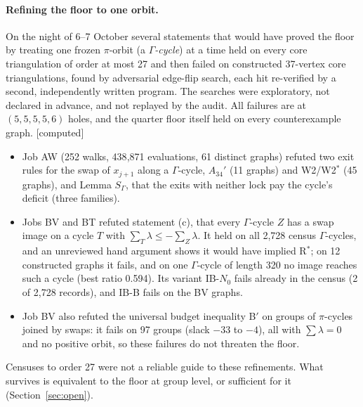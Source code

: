 \documentclass[11pt]{article}
\newcommand{\lab}[1]{\textsf{[#1]}}
\begin{document}
\paragraph{Refining the floor to one orbit.} On the night of 6--7 October several statements that would have proved the floor by treating one frozen $\pi$-orbit (a \emph{$\Gamma$-cycle}) at a time held on every core triangulation of order at most 27 and then failed on constructed 37-vertex core triangulations, found by adversarial edge-flip search, each hit re-verified by a second, independently written program. The searches were exploratory, not declared in advance, and not replayed by the audit. All failures are at $(5,5,5,5,6)$ holes, and the quarter floor itself held on every counterexample graph. \lab{computed}
\begin{itemize}
\item Job AW (252 walks, 438{,}871 evaluations, 61 distinct graphs) refuted two exit rules for the swap of $x_{j+1}$ along a $\Gamma$-cycle, $A_{34}'$ (11 graphs) and W2/W2$^\ast$ (45 graphs), and Lemma $S_\Gamma$, that the exits with neither lock pay the cycle's deficit (three families).
\item Jobs BV and BT refuted statement (c), that every $\Gamma$-cycle $Z$ has a swap image on a cycle $T$ with $\sum_T\lambda\le-\sum_Z\lambda$. It held on all 2{,}728 census $\Gamma$-cycles, and an unreviewed hand argument shows it would have implied R$^\ast$; on 12 constructed graphs it fails, and on one $\Gamma$-cycle of length 320 no image reaches such a cycle (best ratio 0.594). Its variant IB-$N_0$ fails already in the census (2 of 2{,}728 records), and IB-B fails on the BV graphs.
\item Job BV also refuted the universal budget inequality B$'$ on groups of $\pi$-cycles joined by swaps: it fails on 97 groups (slack $-33$ to $-4$), all with $\sum\lambda=0$ and no positive orbit, so these failures do not threaten the floor.
\end{itemize}
Censuses to order 27 were not a reliable guide to these refinements. What survives is equivalent to the floor at group level, or sufficient for it (Section~\ref{sec:open}).
\end{document}

